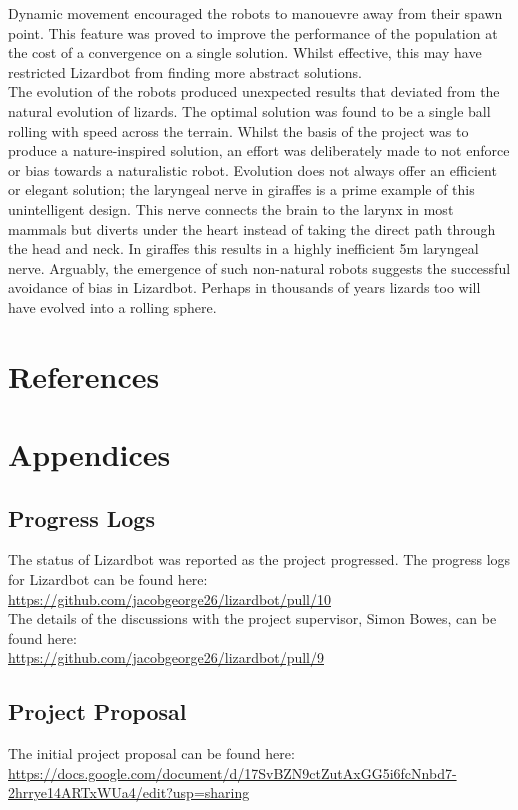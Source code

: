 \documentclass{article}
\begin{document}
Dynamic movement encouraged the robots to manouevre away from their spawn point. This feature was proved to improve the performance of the population at the cost of a convergence on a single solution. Whilst effective, this may have restricted Lizardbot from finding more abstract solutions. \\

The evolution of the robots produced unexpected results that deviated from the natural evolution of lizards. The optimal solution was found to be a single ball rolling with speed across the terrain. Whilst the basis of the project was to produce a nature-inspired solution, an effort was deliberately made to not enforce or bias towards a naturalistic robot. Evolution does not always offer an efficient or elegant solution; the laryngeal nerve in giraffes is a prime example of this unintelligent design. This nerve connects the brain to the larynx in most mammals but diverts under the heart instead of taking the direct path through the head and neck. In giraffes this results in a highly inefficient 5m laryngeal nerve.  Arguably, the emergence of such non-natural robots suggests the successful avoidance of bias in Lizardbot. Perhaps in thousands of years lizards too will have evolved into a rolling sphere. 

\newpage

\section{References}
\label{sec:References}

\newpage


\section{Appendices}
\subsection{Progress Logs}
The status of Lizardbot was reported as the project progressed.
The progress logs for Lizardbot can be found here:\\
\url{https://github.com/jacobgeorge26/lizardbot/pull/10}\\

\noindent The details of the discussions with the project supervisor, Simon Bowes, can be found here:\\
\url{https://github.com/jacobgeorge26/lizardbot/pull/9}


\subsection{Project Proposal}
The initial project proposal can be found here:\\
\url{https://docs.google.com/document/d/17SvBZN9ctZutAxGG5i6fcNnbd7-2hrrye14ARTxWUa4/edit?usp=sharing}
\end{document}
